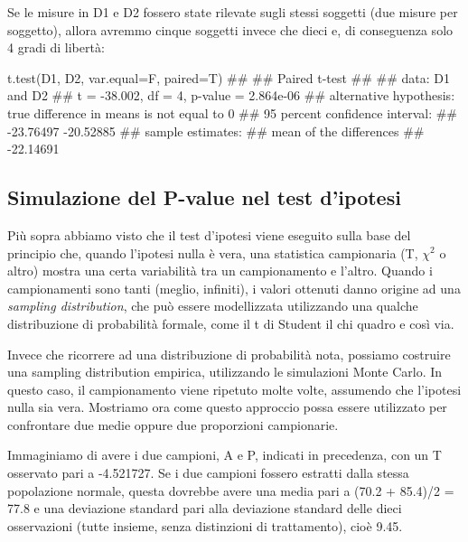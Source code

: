 \documentclass[a4paper,12pt,oneside]{book}
\newenvironment{Shaded}{}{}
\newcommand{\KeywordTok}[1]{#1}
\newcommand{\DataTypeTok}[1]{#1}
\newcommand{\CommentTok}[1]{#1}
\newcommand{\NormalTok}[1]{#1}
\begin{document}
Se le misure in D1 e D2 fossero state rilevate sugli stessi soggetti (due misure per soggetto), allora avremmo cinque soggetti invece che dieci e, di conseguenza solo 4 gradi di libertà:

\begin{Shaded}
\begin{Highlighting}[]
\KeywordTok{t.test}\NormalTok{(D1, D2, }\DataTypeTok{var.equal=}\NormalTok{F, }\DataTypeTok{paired=}\NormalTok{T)}
\CommentTok{## }
\CommentTok{##  Paired t-test}
\CommentTok{## }
\CommentTok{## data:  D1 and D2}
\CommentTok{## t = -38.002, df = 4, p-value = 2.864e-06}
\CommentTok{## alternative hypothesis: true difference in means is not equal to 0}
\CommentTok{## 95 percent confidence interval:}
\CommentTok{##  -23.76497 -20.52885}
\CommentTok{## sample estimates:}
\CommentTok{## mean of the differences }
\CommentTok{##               -22.14691}
\end{Highlighting}
\end{Shaded}

\hypertarget{simulazione-del-p-value-nel-test-dipotesi}{%
\subsection{Simulazione del P-value nel test d'ipotesi}\label{simulazione-del-p-value-nel-test-dipotesi}}

Più sopra abbiamo visto che il test d'ipotesi viene eseguito sulla base del principio che, quando l'ipotesi nulla è vera, una statistica campionaria (T, \(\chi^2\) o altro) mostra una certa variabilità tra un campionamento e l'altro. Quando i campionamenti sono tanti (meglio, infiniti), i valori ottenuti danno origine ad una \emph{sampling distribution}, che può essere modellizzata utilizzando una qualche distribuzione di probabilità formale, come il t di Student il chi quadro e così via.

Invece che ricorrere ad una distribuzione di probabilità nota, possiamo costruire una sampling distribution empirica, utilizzando le simulazioni Monte Carlo. In questo caso, il campionamento viene ripetuto molte volte, assumendo che l'ipotesi nulla sia vera. Mostriamo ora come questo approccio possa essere utilizzato per confrontare due medie oppure due proporzioni campionarie.

Immaginiamo di avere i due campioni, A e P, indicati in precedenza, con un T osservato pari a -4.521727. Se i due campioni fossero estratti dalla stessa popolazione normale, questa dovrebbe avere una media pari a (70.2 + 85.4)/2 = 77.8 e una deviazione standard pari alla deviazione standard delle dieci osservazioni (tutte insieme, senza distinzioni di trattamento), cioè 9.45.
\end{document}
